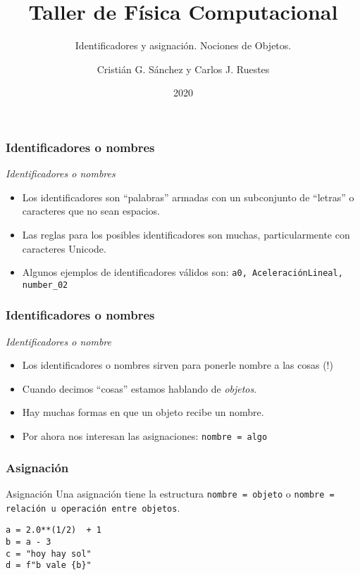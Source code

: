 \documentclass{beamer}
\title{Taller de Física Computacional}
\subtitle{Identificadores y asignación. Nociones de Objetos.}
\author{Cristián G. Sánchez y Carlos J. Ruestes}
\date{2020}
\begin{document}
\frame{\titlepage}

\begin{frame}[fragile]
\frametitle{Identificadores o nombres}
\begin{block}{{\em Identificadores o nombres}}
\begin{itemize}
\item Los identificadores son ``palabras'' armadas con un subconjunto de ``letras'' o caracteres que no sean espacios.
\item Las reglas para los posibles identificadores son muchas, particularmente con caracteres Unicode.
\item Algunos ejemplos de identificadores válidos son: \texttt{a0, AceleraciónLineal, number_02}
\end{itemize}
\end{block}
\end{frame}

\begin{frame}[fragile]
\frametitle{Identificadores o nombres}
\begin{block}{{\em Identificadores o nombre}}
\begin{itemize}
\item Los identificadores o nombres sirven para ponerle nombre a las cosas (!)
\item Cuando decimos ``cosas'' estamos hablando de {\em objetos}.
\item Hay muchas formas en que un objeto recibe un nombre.
\item Por ahora nos interesan las \alert{asignaciones}: {\tt nombre = algo}
\end{itemize}
\end{block}
\end{frame}

\begin{frame}[fragile]
\frametitle{Asignación}
\begin{block}{Asignación}
Una asignación tiene la estructura \texttt{nombre = objeto} o  \texttt{nombre = relación u operación entre objetos}.
\begin{verbatim}
a = 2.0**(1/2)  + 1
b = a - 3
c = "hoy hay sol"
d = f"b vale {b}"
\end{verbatim}
\end{block}
\end{frame}
\end{document}
